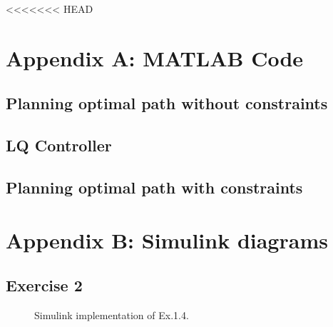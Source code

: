 <<<<<<< HEAD


\begin{appendices}

\section{Appendix A: MATLAB Code}

\label{appendix:A}



\subsection{Planning optimal path without constraints}





\subsection{LQ Controller}





\subsection{Planning optimal path with constraints}









\section{Appendix B: Simulink diagrams}

\label{appendix:B}

\subsection*{Exercise 2}
\begin{figure}[h]
    \centering
    \caption{Simulink implementation of Ex.1.4.}
    \label{sim:ex24}
\end{figure}


\end{appendices}
